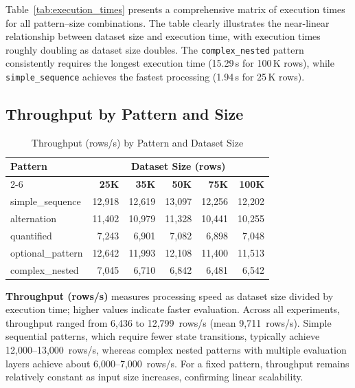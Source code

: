 Table~\ref{tab:execution_times} presents a comprehensive matrix of
execution times for all pattern--size combinations.  The table
clearly illustrates the near-linear relationship between dataset size
and execution time, with execution times roughly doubling as dataset
size doubles.  The \texttt{complex\_nested} pattern consistently
requires the longest execution time (15.29\,s for 100\,K rows), while
\texttt{simple\_sequence} achieves the fastest processing
(1.94\,s for 25\,K rows).

\subsection{Throughput by Pattern and Size}
\label{subsec:eval-throughput}

\enlargethispage{2\baselineskip}

{\small
\begin{longtable}{@{\extracolsep{\fill}}lrrrrr}
\caption{Throughput (rows/s) by Pattern and Dataset Size}
\label{tab:throughput} \\
\toprule
\textbf{Pattern} & \multicolumn{5}{c}{\textbf{Dataset Size (rows)}} \\
\cmidrule(lr){2-6}
 & \textbf{25K} & \textbf{35K} & \textbf{50K} & \textbf{75K} & \textbf{100K} \\
\midrule
\endfirsthead
\midrule
\endhead
\bottomrule
\endfoot
simple\_sequence  & 12{,}918 & 12{,}619 & 13{,}097 & 12{,}256 & 12{,}202 \\
alternation       & 11{,}402 & 10{,}979 & 11{,}328 & 10{,}441 & 10{,}255 \\
quantified        &  7{,}243 &  6{,}901 &  7{,}082 &  6{,}898 &  7{,}048 \\
optional\_pattern & 12{,}642 & 11{,}993 & 12{,}108 & 11{,}400 & 11{,}513 \\
complex\_nested   &  7{,}045 &  6{,}710 &  6{,}842 &  6{,}481 &  6{,}542 \\
\end{longtable}
}

\noindent\textbf{Throughput (rows/s)} measures processing speed as
dataset size divided by execution time; higher values indicate faster
evaluation.  Across all experiments, throughput ranged from
6{,}436 to 12{,}799~rows/s (mean 9{,}711~rows/s).  Simple sequential
patterns, which require fewer state transitions, typically achieve
12{,}000--13{,}000~rows/s, whereas complex nested patterns with
multiple evaluation layers achieve about 6{,}000--7{,}000~rows/s.
For a fixed pattern, throughput remains relatively constant as input
size increases, confirming linear scalability.

